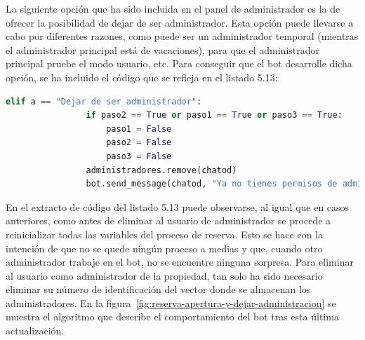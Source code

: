 La siguiente opción que ha sido incluida en el panel de administrador es la de ofrecer la posibilidad de dejar de ser administrador. Esta opción puede llevarse a cabo por diferentes razones, como puede ser un administrador temporal (mientras el administrador principal está de vacaciones), para que el administrador principal pruebe el modo usuario, etc. Para conseguir que el bot desarrolle dicha opción, se ha incluido el código que se refleja en el listado 5.13:
\begin{lstlisting}[language=Python,
    caption={Dejar de ser administrador},
    label=src:dejar-de-ser-administrador
]
            elif a == "Dejar de ser administrador":
                if paso2 == True or paso1 == True or paso3 == True:
                    paso1 = False
                    paso2 = False
                    paso3 = False
                administradores.remove(chatod)
                bot.send_message(chatod, "Ya no tienes permisos de administrador")
\end{lstlisting}
En el extracto de código del listado 5.13 puede observarse, al igual que en casos anteriores, como antes de eliminar al usuario de administrador se procede a reinicializar todas las variables del proceso de reserva. Esto se hace con la intención de que no se quede ningún proceso a medias y que, cuando otro administrador trabaje en el bot, no se encuentre ninguna sorpresa.
Para eliminar al usuario como administrador de la propiedad, tan solo ha sido necesario eliminar su número de identificación del vector donde se almacenan los administradores. En la figura~\ref{fig:reserva-apertura-y-dejar-administracion} se muestra el algoritmo que describe el comportamiento del bot tras esta última actualización.

